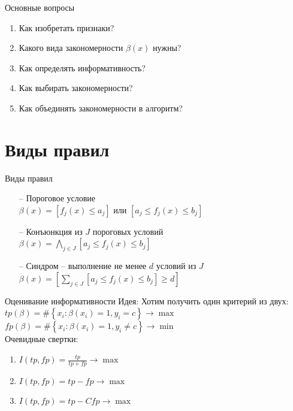 \documentclass[10pt]{beamer}
\begin{document}
\begin{frame}{Основные вопросы}
	\begin{enumerate}
		\item Как изобретать признаки? 
		\item Какого вида закономерности $\beta(x)$ нужны?
		\item Как определять информативность? 
		\item Как выбирать закономерности?
		\item Как объединять закономерности в алгоритм?
	\end{enumerate}
\end{frame}

\section{Виды правил}

\begin{frame}{Виды правил}
	\begin{itemize} [<+->]
	\item[--] Пороговое условие\\
	$\beta(x) = \left[f_j(x) \leq a_j \right]$ или  $\left[a_j \leq f_j(x) \leq b_j \right]$
	\item[--] Конъюнкция из $J$ пороговых условий \\
	$\beta(x) = \bigwedge\limits_{j \in J} \left[a_j \leq f_j(x) \leq b_j \right]$
	\item[--] Синдром -- выполнение не менее $d$ условий из $J$
	$\beta(x) = \left[\sum\limits_{j \in J} \left[a_j \leq f_j(x) \leq b_j \right] \geq d \right]$
	\end{itemize}
\end{frame}

\begin{frame}{Оценивание информативности}
	\alert{Идея}: Хотим получить один критерий из двух:\\
	\bigbreak
	${ tp(\beta) = \# \left\{ x_i: \beta(x_i) = 1 , y_i = c \right\} \rightarrow \max  }$ 
	${ fp(\beta) = \# \left\{ x_i: \beta(x_i) = 1 , y_i \neq c \right\} \rightarrow \min}$ \\
	\bigbreak
	\pause
	Очевидные свертки:\\
	\begin{enumerate}
		\item $I(tp, fp) = \frac{tp}{tp+fp} \rightarrow \max$
		\item $I(tp, fp) = tp-fp \rightarrow \max$
		\item $I(tp, fp) = tp-Cfp \rightarrow \max$			
	\end{enumerate}
\end{frame}
\end{document}
